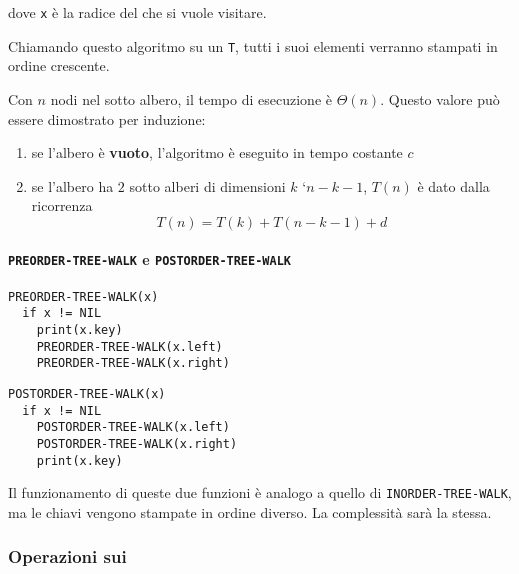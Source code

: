 \documentclass[italian, 10pt]{article}
\begin{document}
dove \texttt{x} è la radice del \BST che si vuole visitare.

\bigskip
Chiamando questo algoritmo su un \BST \texttt{T}, tutti i suoi elementi verranno stampati in ordine crescente.

Con \(n\) nodi nel sotto albero, il tempo di esecuzione è \(\Theta(n)\).
Questo valore può essere dimostrato per induzione:

\begin{enumerate}
  \item se l'albero è \textbf{vuoto}, l'algoritmo è eseguito in tempo costante \(c\)
  \item se l'albero ha \(2\) sotto alberi di dimensioni \(k\) `\(n - k - 1\), \(T(n)\) è dato dalla ricorrenza
        \[ T(n) = T(k) + T(n - k - 1) + d \]
\end{enumerate}

\paragraph{\texttt{PREORDER-TREE-WALK} e \texttt{POSTORDER-TREE-WALK}}

\begin{minipage}[t]{0.495\textwidth}
  \begin{lstlisting}[style=pseudocode, caption={Attraversamento anticipato di \BST}, label={lst:attraversamento-bst-preorder}]
PREORDER-TREE-WALK(x)
  if x != NIL
    print(x.key)
    PREORDER-TREE-WALK(x.left)
    PREORDER-TREE-WALK(x.right)
  \end{lstlisting}
\end{minipage}
\begin{minipage}[t]{0.495\textwidth}
  \begin{lstlisting}[style=pseudocode, caption={Attraversamento posticipato di un \BST}, label={lst:attraversamento-bst-postorder}]
POSTORDER-TREE-WALK(x)
  if x != NIL
    POSTORDER-TREE-WALK(x.left)
    POSTORDER-TREE-WALK(x.right)
    print(x.key)
    \end{lstlisting}
\end{minipage}

Il funzionamento di queste due funzioni è analogo a quello di \texttt{INORDER-TREE-WALK}, ma le chiavi vengono stampate in ordine diverso.
La complessità sarà la stessa.

\subsubsection{Operazioni sui \BST}
\label{sec:operazioni-bst}
\end{document}
